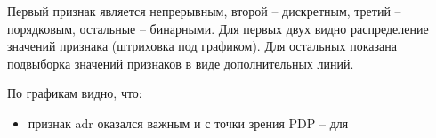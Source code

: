 Первый признак является непрерывным, второй --  дискретным, третий -- порядковым, остальные -- бинарными. Для первых двух видно распределение значений признака (штриховка под графиком). Для остальных показана подвыборка значений признаков в виде дополнительных линий.

По графикам видно, что:
\begin{itemize}
	\item признак adr оказался важным и с точки зрения PDP -- для 
\end{itemize}